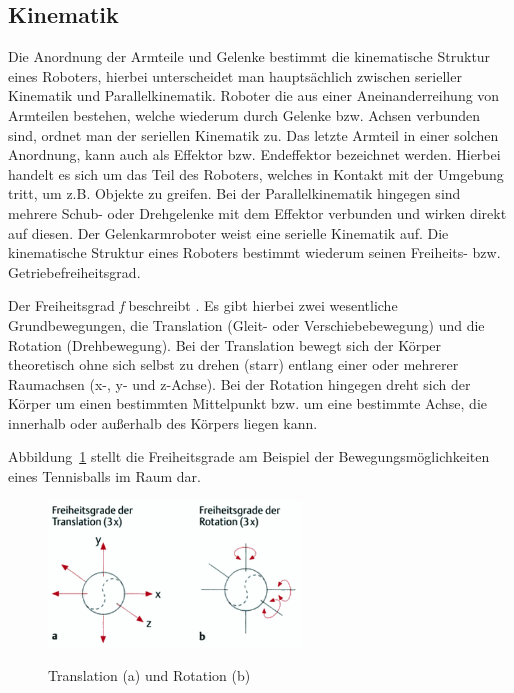 \documentclass[11pt,ngerman,parskip=half]{scrartcl}
\begin{document}
\subsection{Kinematik}
\label{subsec:Kinematik}
Die Anordnung der Armteile und Gelenke bestimmt die kinematische Struktur
eines Roboters, hierbei unterscheidet man hauptsächlich zwischen serieller
Kinematik und Parallelkinematik. Roboter die aus einer Aneinanderreihung von
Armteilen bestehen, welche wiederum durch Gelenke bzw. Achsen verbunden sind,
ordnet man der seriellen Kinematik zu. Das letzte Armteil in einer solchen
Anordnung, kann auch als Effektor bzw. Endeffektor bezeichnet werden. Hierbei
handelt es sich um das Teil des Roboters, welches in Kontakt mit der Umgebung
tritt, um z.B. Objekte zu greifen. Bei der Parallelkinematik hingegen sind
mehrere Schub- oder Drehgelenke mit dem Effektor verbunden und wirken direkt
auf diesen. Der Gelenkarmroboter weist eine serielle Kinematik auf. Die
kinematische Struktur eines Roboters bestimmt wiederum seinen Freiheits- bzw.
Getriebefreiheitsgrad. \parencite[vgl.][17--20]{weber_industrieroboter:_2017}

Der Freiheitsgrad \textit{f} beschreibt
. Es gibt hierbei zwei wesentliche
Grundbewegungen, die Translation (Gleit- oder Verschiebebewegung) und die
Rotation (Drehbewegung). Bei der Translation bewegt sich der Körper
theoretisch ohne sich selbst zu drehen (starr) entlang einer oder mehrerer
Raumachsen (x-, y- und z-Achse). Bei der Rotation hingegen dreht sich der
Körper um einen bestimmten Mittelpunkt bzw. um eine bestimmte Achse, die
innerhalb oder außerhalb des Körpers liegen kann.
\parencite[vgl.][53\psq]{schunke_funktionelle_2014}

Abbildung~\ref{img:translation-rotation} stellt die Freiheitsgrade am
Beispiel der Bewegungsmöglichkeiten eines Tennisballs im Raum dar.
\begin{figure}[H]
  \centering
  \includegraphics[width=0.6\textwidth]{src/img/translation-rotation.png}
  \caption{Translation (a) und Rotation (b)}
  \label{img:translation-rotation}
  \parencite[][53]{schunke_funktionelle_2014}
\end{figure}
\end{document}

